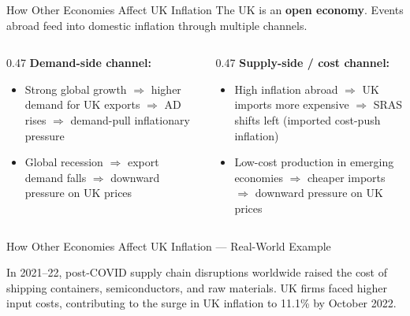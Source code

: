 \documentclass[16pt,aspectratio=169]{beamer}
\begin{document}
\begin{frame}{How Other Economies Affect UK Inflation}
    The UK is an \textbf{open economy}. Events abroad feed into domestic inflation through multiple channels.

    \vspace{0.5em}
    \begin{columns}
        \begin{column}{0.47\textwidth}
            \textbf{Demand-side channel:}
            \begin{itemize}\setlength\itemsep{0.3em}
                \item Strong global growth $\Rightarrow$ higher demand for UK exports $\Rightarrow$ AD rises $\Rightarrow$ demand-pull inflationary pressure
                \item Global recession $\Rightarrow$ export demand falls $\Rightarrow$ downward pressure on UK prices
            \end{itemize}
        \end{column}
        \begin{column}{0.47\textwidth}
            \textbf{Supply-side / cost channel:}
            \begin{itemize}\setlength\itemsep{0.3em}
                \item High inflation abroad $\Rightarrow$ UK imports more expensive $\Rightarrow$ SRAS shifts left (imported cost-push inflation)
                \item Low-cost production in emerging economies $\Rightarrow$ cheaper imports $\Rightarrow$ downward pressure on UK prices
            \end{itemize}
        \end{column}
    \end{columns}
\end{frame}

\begin{frame}{How Other Economies Affect UK Inflation --- Real-World Example}
    \begin{example}
        In 2021--22, post-COVID supply chain disruptions worldwide raised the cost of shipping containers, semiconductors, and raw materials. UK firms faced higher input costs, contributing to the surge in UK inflation to 11.1\% by October 2022.
    \end{example}
\end{frame}
\end{document}
